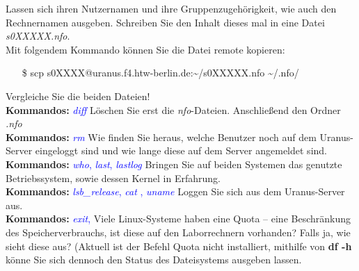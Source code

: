 \documentclass[paper=a4,fontsize=11pt]{scrartcl}%
\numberwithin{equation}{section}
\begin{document}
{\begin{enumerate}
\begin{tasks}
           Lassen sich ihren Nutzernamen und ihre Gruppenzugehörigkeit, wie auch den Rechnernamen ausgeben. Schreiben Sie den Inhalt dieses mal in eine Datei \emph{s0XXXXX.nfo}.\\
           Mit folgendem Kommando können Sie die Datei remote kopieren: 
           \begin{itemize}
          \item[\$]scp s0XXXX@uranus.f4.htw-berlin.de:\textasciitilde /s0XXXXX.nfo \textasciitilde/.nfo/
          \end{itemize}
          \task Vergleiche Sie die beiden Dateien!\\
          \textbf{Kommandos:} \textcolor{blue}{\emph{diff}}
          \task Löschen Sie erst die \emph{nfo}-Dateien. Anschließend den Ordner \emph{.nfo}\\
          \textbf{Kommandos:} \textcolor{blue}{\emph{rm}}
          \task Wie finden Sie heraus, welche Benutzer noch auf dem Uranus-Server eingeloggt sind und wie lange diese auf dem Server angemeldet sind.\\
          \textbf{Kommandos:} \textcolor{blue}{\emph{who}, \emph{last}, \emph{lastlog}}
          \task Bringen Sie auf beiden Systemen das genutzte Betriebssystem, sowie dessen Kernel in Erfahrung.\\
          \textbf{Kommandos:} \textcolor{blue}{\emph{lsb\_release}, \emph{cat }, \emph{uname}}
          \task Loggen Sie sich aus dem Uranus-Server aus.\\
          \textbf{Kommandos:} \textcolor{blue}{\emph{exit}, }
          \task Viele Linux-Systeme haben eine Quota -- eine Beschränkung des Speicherverbrauchs, ist diese auf den Laborrechnern vorhanden? Falls ja, wie sieht diese aus? (Aktuell ist der Befehl Quota nicht installiert, mithilfe von \textbf{df -h} könne Sie sich dennoch den Status des Dateisystems ausgeben lassen.
        \end{tasks}
\end{enumerate}

}
\end{document}

